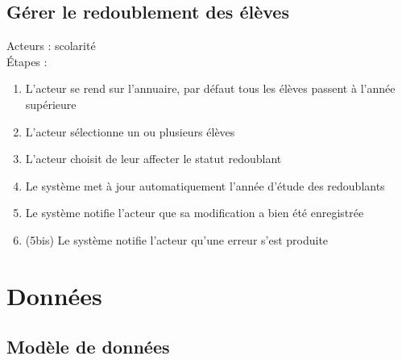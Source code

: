 \documentclass{scrreprt}
\begin{document}
\subsection{Gérer le redoublement des élèves}
Acteurs : scolarité
\\
\'Etapes :
\begin{enumerate}
\item L’acteur se rend sur l’annuaire, par défaut tous les élèves passent à l’année supérieure
\item L’acteur sélectionne un ou plusieurs élèves
\item L’acteur choisit de leur affecter le statut redoublant
\item Le système met à jour automatiquement l’année d’étude des redoublants
\item Le système notifie l’acteur que sa modification a bien été enregistrée 
\item (5bis) Le système notifie l’acteur qu’une erreur s’est produite
\end{enumerate}



\section{Donn\'ees}
\subsection{Mod\`ele de donn\'ees}
\end{document}
